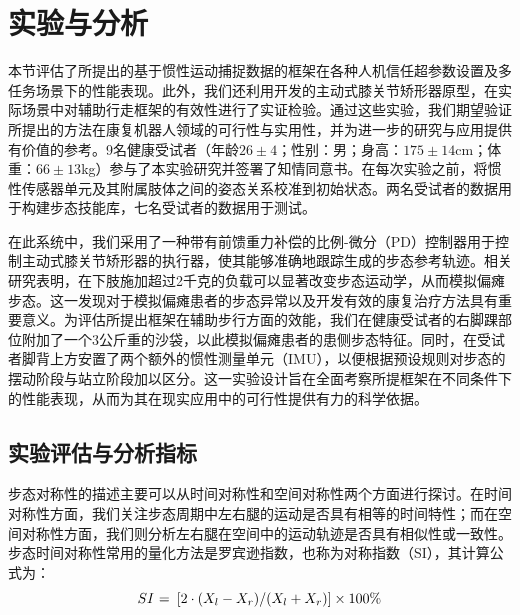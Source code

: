 \section{实验与分析}本节评估了所提出的基于惯性运动捕捉数据的框架在各种人机信任超参数设置及多任务场景下的性能表现。此外，我们还利用开发的主动式膝关节矫形器原型，在实际场景中对辅助行走框架的有效性进行了实证检验。通过这些实验，我们期望验证所提出的方法在康复机器人领域的可行性与实用性，并为进一步的研究与应用提供有价值的参考。9名健康受试者（年龄$26\pm 4$；性别：男；身高：$175\pm 14$cm；体重：$66\pm13$kg）参与了本实验研究并签署了知情同意书。在每次实验之前，将惯性传感器单元及其附属肢体之间的姿态关系校准到初始状态\cite{tongLSTMBasedLowerLimbs2020}。两名受试者的数据用于构建步态技能库，七名受试者的数据用于测试。  

在此系统中，我们采用了一种带有前馈重力补偿的比例-微分（PD）控制器用于控制主动式膝关节矫形器的执行器，使其能够准确地跟踪生成的步态参考轨迹。相关研究\cite{zanottoAdaptiveAssistasneededController2014a}表明，在下肢施加超过2千克的负载可以显著改变步态运动学，从而模拟偏瘫步态。这一发现对于模拟偏瘫患者的步态异常以及开发有效的康复治疗方法具有重要意义。为评估所提出框架在辅助步行方面的效能，我们在健康受试者的右脚踝部位附加了一个3公斤重的沙袋，以此模拟偏瘫患者的患侧步态特征。同时，在受试者脚背上方安置了两个额外的惯性测量单元（IMU），以便根据预设规则对步态的摆动阶段与站立阶段加以区分。这一实验设计旨在全面考察所提框架在不同条件下的性能表现，从而为其在现实应用中的可行性提供有力的科学依据。


\subsection{实验评估与分析指标}步态对称性的描述主要可以从时间对称性和空间对称性两个方面进行探讨。在时间对称性方面，我们关注步态周期中左右腿的运动是否具有相等的时间特性；而在空间对称性方面，我们则分析左右腿在空间中的运动轨迹是否具有相似性或一致性。步态时间对称性常用的量化方法是罗宾逊指数\cite{viteckovaGaitSymmetryMeasures2018}，也称为对称指数（SI），其计算公式为：
\begin{equation}
\label{deqn_ex21}
{SI}{\text{ = }}\left[ {{{2 \cdot \left( {{X_l} - {X_r}} \right)} \mathord{\left/
{\vphantom {{2 \cdot \left( {{X_l} - {X_r}} \right)} {\left( {{X_l} + {X_r}} \right)}}} \right.
\kern-\nulldelimiterspace} {\left( {{X_l} + {X_r}} \right)}}} \right] \times 100 \%  
\end{equation}

